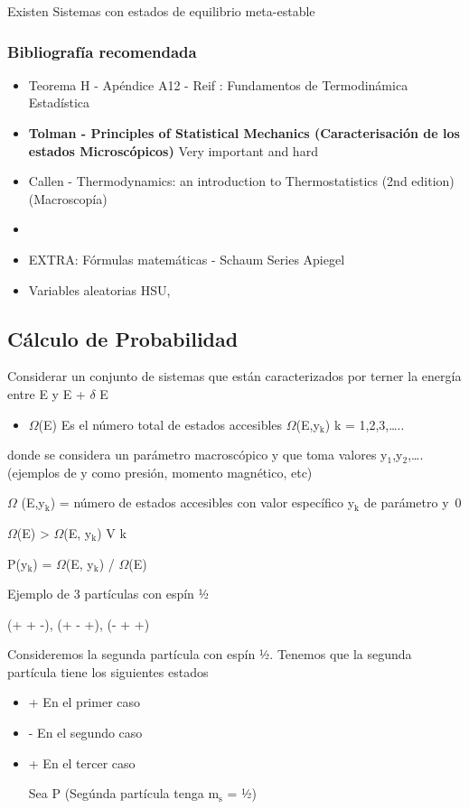 \documentclass[11pt]{article}
\begin{document}
Existen Sistemas con estados de equilibrio meta-estable
\subsubsection{Bibliografía recomendada}
\label{sec-1-3-3}
\begin{itemize}
\item Teorema H - Apéndice A12 - Reif : Fundamentos de Termodinámica Estadística
\item \textbf{Tolman - Principles of Statistical Mechanics (Caracterisación de los estados Microscópicos)} Very important and hard
\item Callen - Thermodynamics: an introduction to Thermostatistics (2nd edition) (Macroscopía)
\item 
\item EXTRA: Fórmulas matemáticas - Schaum Series Apiegel
\item Variables aleatorias HSU,
\end{itemize}
\subsection{Cálculo de Probabilidad}
\label{sec-1-4}
Considerar un conjunto de sistemas que están caracterizados por terner
la energía entre E y E + $\delta$ E

\begin{itemize}
\item $\Omega$(E) Es el número total de estados accesibles
$\Omega$(E,y$_{\text{k}}$)  k = 1,2,3,\ldots{}..
\end{itemize}
donde se considera un parámetro macroscópico y que toma valores y$_{\text{1}}$,y$_{\text{2}}$,\ldots{}. (ejemplos de y como presión, momento magnético, etc)

$\Omega$ (E,y$_{\text{k}}$) = número de estados accesibles con valor específico y$_{\text{k}}$ de parámetro y 0

$\Omega$(E) > $\Omega$(E, y$_{\text{k}}$) V k

P(y$_{\text{k}}$) = $\Omega$(E, y$_{\text{k}}$) / $\Omega$(E)


Ejemplo de 3 partículas con espín ½

(+ + -), (+ - +), (- + +)


Consideremos la segunda partícula con espín ½. Tenemos que la segunda partícula tiene los siguientes estados

\begin{itemize}
\item + En el primer caso
\item - En el segundo caso
\item + En el tercer caso

Sea P (Segúnda partícula tenga m$_{\text{s}}$ = ½)
\end{itemize}
\end{document}
